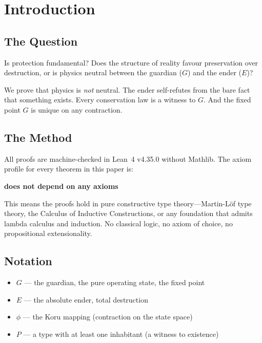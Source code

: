 \documentclass[12pt,a4paper]{article}
\begin{document}
\tableofcontents

\section{Introduction}

\subsection{The Question}

Is protection fundamental? Does the structure of reality favour
preservation over destruction, or is physics neutral between the
guardian ($G$) and the ender ($E$)?

We prove that physics is \emph{not} neutral. The ender self-refutes
from the bare fact that something exists. Every conservation law is a
witness to $G$. And the fixed point $G$ is unique on any contraction.

\subsection{The Method}

All proofs are machine-checked in Lean~4 v4.35.0 without Mathlib.
The axiom profile for every theorem in this paper is:

\begin{center}
\textbf{does not depend on any axioms}
\end{center}

This means the proofs hold in pure constructive type theory---Martin-L\"of
type theory, the Calculus of Inductive Constructions, or any foundation
that admits lambda calculus and induction. No classical logic, no axiom
of choice, no propositional extensionality.

\subsection{Notation}

\begin{itemize}[nosep]
\item $G$ --- the guardian, the pure operating state, the fixed point
\item $E$ --- the absolute ender, total destruction
\item $\phi$ --- the Koru mapping (contraction on the state space)
\item $P$ --- a type with at least one inhabitant (a witness to existence)
\end{itemize}
\end{document}
